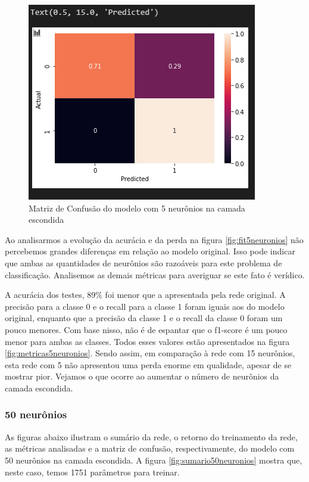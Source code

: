 \documentclass[12pt]{article}
\begin{document}
\begin{figure}[H]
	\centering
	\includegraphics[width=0.7\linewidth]{Imagens/5neuronios/confusao5neuronios}
	\caption{Matriz de Confusão do modelo com 5 neurônios na camada escondida}
	\label{fig:confusao5neuronios}
\end{figure}

Ao analisarmos a evolução da acurácia e da perda na figura \ref{fig:fit5neuronios} não percebemos grandes diferenças em relação ao modelo original. Isso pode indicar que ambas as quantidades de neurônios são razoáveis para este problema de classificação. Analisemos as demais métricas para averiguar se este fato é verídico.

A acurácia dos testes, 89\% foi menor que a apresentada pela rede original. A precisão para a classe 0 e o recall para a classe 1 foram iguais aos do modelo original, enquanto que a precisão da classe 1 e o recall da classe 0 foram um pouco menores. Com base nisso, não é de espantar que o f1-score é um pouco menor para ambas as classes. Todos esses valores estão apresentados na figura \ref{fig:metricas5neuronios}. Sendo assim, em comparação à rede com 15 neurônios, esta rede com 5 não apresentou uma perda enorme em qualidade, apesar de se mostrar pior. Vejamos o que ocorre ao aumentar o número de neurônios da camada escondida.

\subsubsection{50 neurônios}

As figuras abaixo ilustram o sumário da rede, o retorno do treinamento da rede, as métricas analisadas e a matriz de confusão, respectivamente, do modelo com 50 neurônios na camada escondida. A figura \ref{fig:sumario50neuronios} mostra que, neste caso, temos 1751 parâmetros para treinar.
\end{document}
